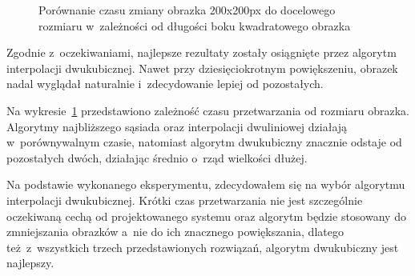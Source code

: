 \begin{figure}[h]
    \centering
    \caption{Porównanie czasu zmiany obrazka 200x200px do docelowego rozmiaru w~zależności od długości boku kwadratowego obrazka}
    \label{fig:resizing-time}
\end{figure}

Zgodnie z~oczekiwaniami, najlepsze rezultaty zostały osiągnięte przez algorytm interpolacji dwukubicznej. Nawet przy dziesięciokrotnym powiększeniu, obrazek nadal wyglądał naturalnie i~zdecydowanie lepiej od pozostałych.  

Na wykresie~\ref{fig:resizing-time} przedstawiono zależność czasu przetwarzania od rozmiaru obrazka. Algorytmy najbliższego sąsiada oraz interpolacji dwuliniowej działają w~porównywalnym czasie, natomiast algorytm dwukubiczny znacznie odstaje od pozostałych dwóch, działając średnio o~rząd wielkości dłużej.

Na podstawie wykonanego eksperymentu, zdecydowałem się na wybór algorytmu interpolacji dwukubicznej. Krótki czas przetwarzania nie jest szczególnie oczekiwaną cechą od projektowanego systemu oraz algorytm będzie stosowany do zmniejszania obrazków a~nie do ich znacznego powiększania, dlatego też z~wszystkich trzech przedstawionych rozwiązań, algorytm dwukubiczny jest najlepszy.

